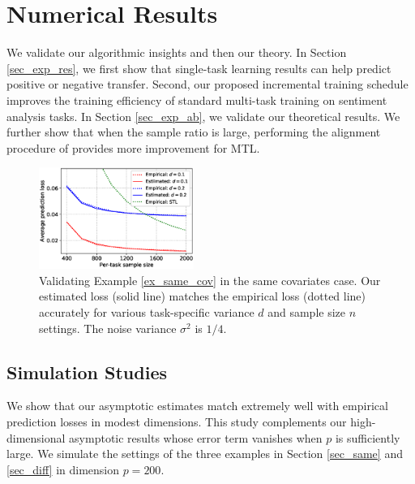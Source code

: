 \section{Numerical Results}

We validate our  algorithmic insights and then our theory.
In Section \ref{sec_exp_res}, we first show that single-task learning results can help predict positive or negative transfer.
Second, our proposed incremental training schedule improves the training efficiency of standard multi-task training on sentiment analysis tasks.
In Section \ref{sec_exp_ab}, we validate our theoretical results.
We further show that when the sample ratio is large, performing the alignment procedure of \cite{WZR20} provides more improvement for MTL.



\begin{figure}[!t]
	\centering
	\includegraphics[width=0.45\textwidth]{figures/same_covariates.eps}
	\caption{Validating Example \ref{ex_same_cov} in the same covariates case. Our estimated loss (solid line) matches the empirical loss (dotted line) accurately for various task-specific variance $d$ and sample size $n$ settings. The noise variance $\sigma^2$ is $1/4$.}
	\label{fig_same_cov}
\end{figure}

\subsection{Simulation Studies}\label{sec_simulation}

We show that our asymptotic estimates match extremely well with empirical prediction losses in modest dimensions.
This study complements our high-dimensional asymptotic results whose error term vanishes when $p$ is sufficiently large.
We simulate the settings of the three examples in Section \ref{sec_same} and \ref{sec_diff} in dimension $p = 200$.

